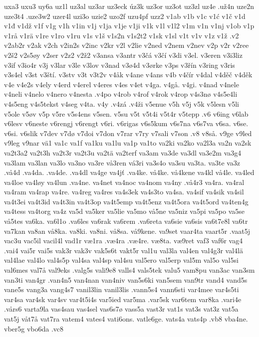 {{uxa3
uxu3
uy6a
uz1l
uz3al
uz3ar
uz3eck
úz3k
uz3or
uz3ot
uz3zl
uz4e
.už4n
uze2n
uze3t4
.uze3w2
uzer4l
uzi3o
uzie2
uzo2f
uzu4pf
uzz2
v1ab
v1b
v1c
v1ć
v1č
v1d
v1đ
v1dž
v1f
v1g
v1h
v1in
v1j
v1ja
v1je
v1ji
v1k
v1l
v1l2
v1m
v1n
v1nj
v1ob
v1p
v1rå
v1rä
v1re
v1ro
v1ru
v1s
v1š
v1s2n
v1s2t2
v1sk
v1sl
v1t
v1v
v1z
v1ž
.v2
v2ab2r
v2ak
v2ch
v2in2s
v2inc
v2kr
v2l
v2lie
v2ned
v2nem
v2nev
v2p
v2r
v2ree
v2š2
v2s5øy
v2ser
v2z2
v2ž2
v3ansa
v3antr
v3čá
v3čí
v3di
v3el.
v3eren
v3i3liz
v3if
v3io4r
v3j
v3lar
v3le
v3lov
v3nad
v3ø4d
v3ørke
v3ps
v3řín
v3ring
v3ris
v3s4el
v3st
v3ští.
v3stv
v3t
v3t2v
v4åk
v4ane
v4ans
v4b
v4čír
v4dal
v4děč
v4děk
v4e
v4e2s
v4ely
v4erd
v4erel
v4eres
v4es
v4et
v4ga.
v4gå.
v4gi.
v4nad
v4nele
v4neli
v4nelo
v4nero
v4nesta
.v4po
v4rob
v4rof
v4rok
v4rop
v4s3nø
v4s5e4li
v4s5eng
v4s5tekst
v4seg
v4ta.
v4y
.v4zá
.v4ži
v5enue
v5h
v5j
v5k
v5lesn
v5li
v5ole
v5øv
v5p
v5re
v5s4ens
v5sen.
v5su
v5t
v5t4i
v5t4r
v5tepp
.v6
v6ing
v6lab
v6lesv
v6neste
v6rengj
v6rengt
v6ri.
v6rigas
v6s5kum
v6s7na
v6s7va
v6sa.
v6se.
v6si.
v6slik
v7dev
v7dø
v7doi
v7don
v7rar
v7ry
v7sali
v7son
.v8
v8så.
v9ge
v9led
v9leg
v9nar
vä1
va1c
va1f
va1ku
va1lu
va1p
va1to
va2ki
va2ko
va2l3a
va2n
va2sk
va2t3a2
va2t3h
va2t3r
va2t3u
va2tä
va2terf
va3am
va3de
va3dl
va3e2m
va3g4
va3lam
va3lan
va3lo
va3no
va3re
vå3ren
vá3ri
va3s4o
va3su
va3ta.
va3te
va3z
.vå4d
.va4da.
.va4de.
.va4dl
va4ge
va4jť
.va4ke.
vå4ke.
vå4kene
va4kl
vå4le.
va4led
va4loe
va4løy
va4lun
.va4ne.
va4net
va4noc
va4nom
va4ny
.vå4r3
va4ra.
va4ral
va4ram
va4rap
va4re.
va4reg
va4res
va4s3ek
va4s3to
va4sa.
va4sif
va4sik
va4sil
va4t3ei
va4t3id
va4t3in
va4t3op
va4t5emp
va4t5enz
va4t5ora
va4t5ord
va4ten4g
va4tess
va4torg
va4z
va5d
va5ker
va5lie
va5mo
vå5ne
va5niz
va5pi
va5po
va5se
vå5tes
va6ka.
va6l1o
.va6les
va6rak
va6rem
.va6reta
va6sie
va6sis
va6t7e8l
va6tr
va7kan
va8an
vå8ka.
va8ki.
va8ni.
vå8sa.
vå9kene.
va9set
vaar4ta
vaart5r
.vaat5j
vac3u
vac5il
vacil4l
vad1r
væ1ra
.væ4ra
.væ4re.
væ8ta.
væ9ret
vaf3
vaf6r
vag4
.vai4
vai5r
vai5s
vak3r
vak3v
vak5s6t
vakt5r
val1u
val3la
val4en
val4g3r
val4lä
val4lae
val4lo
val4s5p
val4sa
val4sp
val4su
val5ero
val5erp
val5m
val5o
val5si
val6mes
val7å
val9eks
.valg5s
vali9e8
valls4
vals5tek
valu5
vam8pu
van3ac
van3sm
van3ti
van4gr
.van4n5
van4nan
van4niv
van5s6ki
van5sem
van9tr
vand4
vand5s
vane5s
vang3a
vang4s7
vanil3lin
vanil3lis
.vann5s4
vann6sti
var4mee
var4s5ti
var4sa
var4sk
var4sv
var4t5i4s
var5ied
var5ma
.var5sk
var6tem
var8ka
.vari4e
.vårs6
varta9la
vas4sau
vas4sel
vas6s7ø
vass5a
vast3r
vat1s
vat3s
vat3z
vat5a
vat5j
våt7å
vat7ra
vatem4
vates4
vati6ons.
vatle6ge.
vats4a
vats4p
.vb8
vba4ne.
vber5g
vbo6da
.vc8
}}
